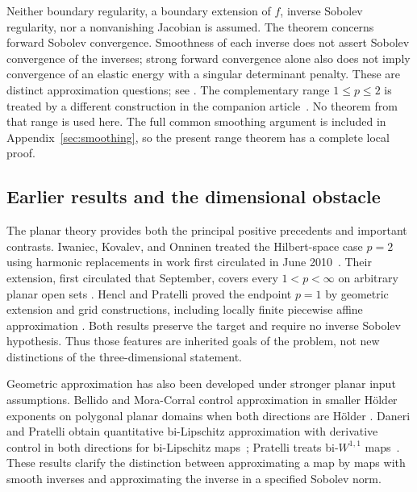 \documentclass[11pt]{article}
\numberwithin{equation}{section}
\theoremstyle{definition}
\theoremstyle{remark}
\begin{document}
Neither boundary regularity, a boundary extension of $f$, inverse
Sobolev regularity, nor a nonvanishing Jacobian is assumed.  The
theorem concerns forward Sobolev convergence.  Smoothness of each
inverse does not assert Sobolev convergence of the inverses; strong
forward convergence alone also does not imply convergence of an elastic
energy with a singular determinant penalty.  These are distinct
approximation questions; see \cite{Ball2002,Pratelli2017,Hencl2025}.
The complementary range $1\le p\le2$ is treated by a different
construction in the companion article~\cite{OpenAILow2026}.
No theorem from that range is used here.  The full common smoothing
argument is included in Appendix~\ref{sec:smoothing}, so the present
range theorem has a complete local proof.

\subsection{Earlier results and the dimensional obstacle}

The planar theory provides both the principal positive precedents and
important contrasts.  Iwaniec, Kovalev, and Onninen treated the
Hilbert-space case $p=2$ using harmonic replacements in work first
circulated in June 2010~\cite{IwaniecKovalevOnninen2012}.  Their extension,
first circulated that September, covers every $1<p<\infty$ on arbitrary planar open sets
\cite[Theorem~1.1]{IwaniecKovalevOnninen2011}.  Hencl and Pratelli
proved the endpoint $p=1$ by geometric extension and grid constructions,
including locally finite piecewise affine approximation
\cite[Theorem~1.1]{HenclPratelli2018}.  Both results preserve the
target and require no inverse Sobolev hypothesis.  Thus those features
are inherited goals of the problem, not new distinctions of the
three-dimensional statement.

Geometric approximation has also been developed under stronger planar
input assumptions.  Bellido and Mora-Corral control approximation in
smaller H\"older exponents on polygonal planar domains when both
directions are H\"older
\cite{BellidoMoraCorral2011}.  Daneri and Pratelli obtain quantitative
bi-Lipschitz approximation with derivative control in both directions
for bi-Lipschitz maps~\cite{DaneriPratelli2014}; Pratelli treats
bi-$W^{1,1}$ maps~\cite{Pratelli2017}.  These results clarify the
distinction between approximating a map by maps with smooth inverses
and approximating the inverse in a specified Sobolev norm.
\end{document}
